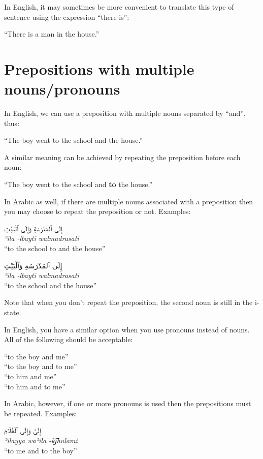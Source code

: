 \documentclass[
  10pt,
]{book}
\begin{document}
In English, it may sometimes be more convenient to translate this type of sentence using the expression \enquote{there is}:

\enquote{There is a man in the house.}

\section{Prepositions with multiple nouns/pronouns}\label{prepositions-with-multiple-nounspronouns}

In English, we can use a preposition with multiple nouns separated by \enquote{and}, thus:

\enquote{The boy went to the school and the house.}

A similar meaning can be achieved by repeating the preposition before each noun:

\enquote{The boy went to the school and \textbf{to} the house.}

In Arabic as well, if there are multiple nouns associated with a preposition then you may choose to repeat the preposition or not. Examples:

\foreignlanguage{arabic}{إِلَى ٱلمَدْرَسَةِ وَإِلَى ٱلْبَيْتِ}\\
\emph{ʾila -lbayti walmadrasati}\\
\enquote{to the school to and the house}

\foreignlanguage{arabic}{إِلَى ٱلمَدْرَسَةِ وَٱلْبَيْتِ}\\
\emph{ʾila -lbayti walmadrasati}\\
\enquote{to the school and the house}

Note that when you don't repeat the preposition, the second noun is still in the i-state.

In English, you have a similar option when you use pronouns instead of nouns. All of the following should be acceptable:

\enquote{to the boy and me}\\
\enquote{to the boy and to me}\\
\enquote{to him and me}\\
\enquote{to him and to me}

In Arabic, however, if one or more pronouns is used then the prepositions must be repeated. Examples:

\foreignlanguage{arabic}{إِلَيَّ وَإِلَى ٱلْغُلَامِ}\\
\emph{ʾilayya waʾila -lg͡hulāmi}\\
\enquote{to me and to the boy}
\end{document}
